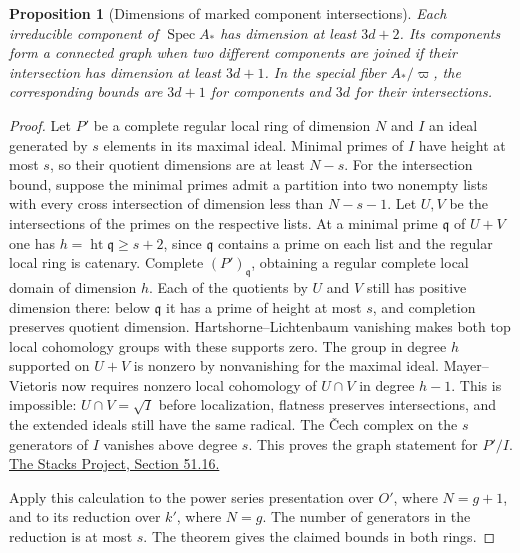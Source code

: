 \documentclass[a4paper,11pt]{article}
\newtheorem{proposition}{Proposition}[section]
\theoremstyle{definition}
\theoremstyle{remark}
\numberwithin{equation}{section}
\begin{document}
\begin{proposition}[Dimensions of marked component intersections]\leavevmode
\label{prop:dimensionchain420}
Each irreducible component of \(\operatorname{Spec} A_*\) has
dimension at least \(3d+2\). Its components form a connected
graph when two different components are joined if their
intersection has dimension at least \(3d+1\). In the special
fiber \(A_*/\varpi\), the corresponding bounds are \(3d+1\)
for components and \(3d\) for their intersections.
\end{proposition}
\begin{proof}
Let \(P'\) be a complete regular local ring of dimension \(N\)
and \(I\) an ideal generated by \(s\) elements in its maximal
ideal. Minimal primes of \(I\) have height at most \(s\), so
their quotient dimensions are at least \(N-s\). For the
intersection bound, suppose the minimal primes admit a partition
into two nonempty lists with every cross intersection of
dimension less than \(N-s-1\). Let \(U,V\) be the intersections
of the primes on the respective lists. At a minimal prime
\(\mathfrak q\) of \(U+V\) one has
\(h=\operatorname{ht}\mathfrak q\ge s+2\), since \(\mathfrak q\)
contains a prime on each list and the regular local ring is
catenary. Complete \((P')_{\mathfrak q}\), obtaining a regular
complete local domain of dimension \(h\). Each of the quotients
by \(U\) and \(V\) still has positive dimension there: below
\(\mathfrak q\) it has a prime of height at most \(s\), and
completion preserves quotient dimension. Hartshorne--Lichtenbaum
vanishing makes both top local cohomology groups with these
supports zero. The group in degree \(h\) supported on \(U+V\)
is nonzero by nonvanishing for the maximal ideal. Mayer--Vietoris
now requires nonzero local cohomology of \(U\cap V\) in degree
\(h-1\). This is impossible: \(U\cap V=\sqrt I\) before
localization, flatness preserves intersections, and the extended
ideals still have the same radical. The \v Cech complex on the
\(s\) generators of \(I\) vanishes above degree \(s\).
This proves the graph statement for \(P'/I\).
\href{https://stacks.math.columbia.edu/tag/0EB0}{The Stacks Project,
Section 51.16.}

Apply this calculation to the power series presentation over
\(O'\), where \(N=g+1\), and to its reduction over \(k'\),
where \(N=g\). The number of generators in the reduction is
at most \(s\). The theorem gives the claimed bounds in both rings.
\end{proof}
\end{document}
